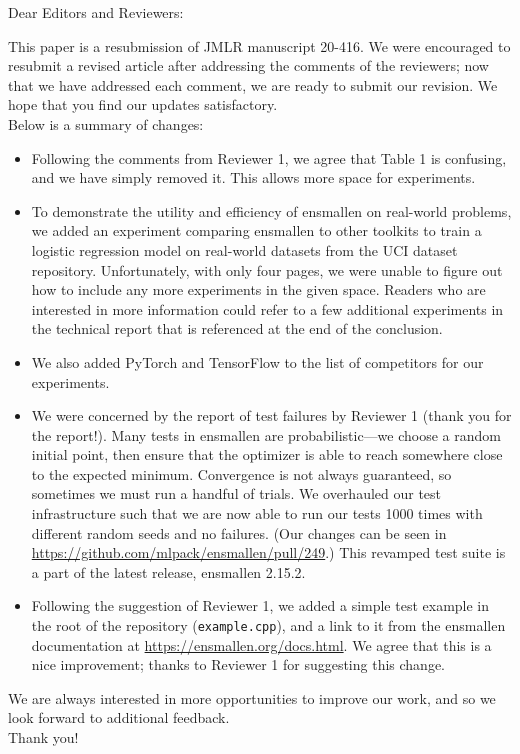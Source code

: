 \documentclass[twoside,11pt]{article}
\begin{document}
\noindent Dear Editors and Reviewers: \\

\medskip

\noindent This paper is a resubmission of JMLR manuscript 20-416.  We were
encouraged to resubmit a revised article after addressing the comments of the
reviewers; now that we have addressed each comment, we are ready to submit our
revision.  We hope that you find our updates satisfactory. \\

\noindent Below is a summary of changes:

\begin{itemize}
  \item Following the comments from Reviewer 1, we agree that Table 1 is
confusing, and we have simply removed it.  This allows more space for
experiments.

  \item To demonstrate the utility and efficiency of ensmallen on real-world
problems, we added an experiment comparing ensmallen to other toolkits to train
a logistic regression model on real-world datasets from the UCI dataset
repository.  Unfortunately, with only four pages, we were unable to figure out
how to include any more experiments in the given space.  Readers who are
interested in more information could refer to a few additional experiments in
the technical report that is referenced at the end of the conclusion.

  \item We also added PyTorch and TensorFlow to the list of competitors for our
experiments.

  \item We were concerned by the report of test failures by Reviewer 1 (thank
you for the report!).  Many tests in ensmallen are probabilistic---we choose a
random initial point, then ensure that the optimizer is able to reach somewhere
close to the expected minimum.  Convergence is not always guaranteed, so
sometimes we must run a handful of trials.  We overhauled our test
infrastructure such that we are now able to run our tests 1000 times with
different random seeds and no failures.  (Our changes can be seen in
\url{https://github.com/mlpack/ensmallen/pull/249}.)  This revamped test suite
is a part of the latest release, ensmallen 2.15.2.

  \item Following the suggestion of Reviewer 1, we added a simple test example
in the root of the repository ({\tt example.cpp}), and a link to it from the
ensmallen documentation at \url{https://ensmallen.org/docs.html}.  We agree that
this is a nice improvement; thanks to Reviewer 1 for suggesting this change.
\end{itemize}

\noindent We are always interested in more opportunities to improve our work,
and so we look forward to additional feedback. \\

\noindent Thank you!
\end{document}
